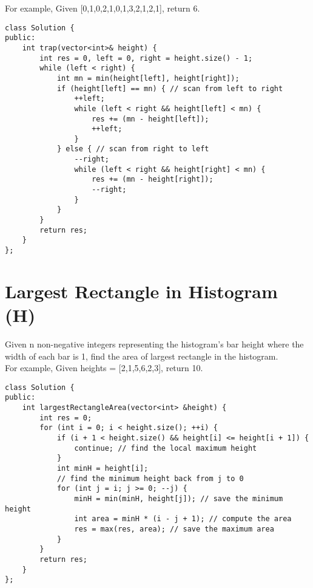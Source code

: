 For example, Given [0,1,0,2,1,0,1,3,2,1,2,1], return 6. \\

\begin{lstlisting}
class Solution {
public:
    int trap(vector<int>& height) {
        int res = 0, left = 0, right = height.size() - 1;
        while (left < right) {
            int mn = min(height[left], height[right]);
            if (height[left] == mn) { // scan from left to right
                ++left;
                while (left < right && height[left] < mn) {
                    res += (mn - height[left]);
                    ++left;
                }
            } else { // scan from right to left
                --right;
                while (left < right && height[right] < mn) {
                    res += (mn - height[right]);
                    --right;
                }
            }
        }
        return res;
    }
};
\end{lstlisting}


\section{Largest Rectangle in Histogram (H)}
Given n non-negative integers representing the histogram's bar height where the width of each bar is 1, find the area of largest rectangle in the histogram. \\

For example,
Given heights = [2,1,5,6,2,3],
return 10. \\

\begin{lstlisting}
class Solution {
public:
    int largestRectangleArea(vector<int> &height) {
        int res = 0;
        for (int i = 0; i < height.size(); ++i) {
            if (i + 1 < height.size() && height[i] <= height[i + 1]) {
                continue; // find the local maximum height
            }
            int minH = height[i];
            // find the minimum height back from j to 0
            for (int j = i; j >= 0; --j) { 
                minH = min(minH, height[j]); // save the minimum height
                int area = minH * (i - j + 1); // compute the area
                res = max(res, area); // save the maximum area
            }
        }
        return res;
    }
};
\end{lstlisting}



